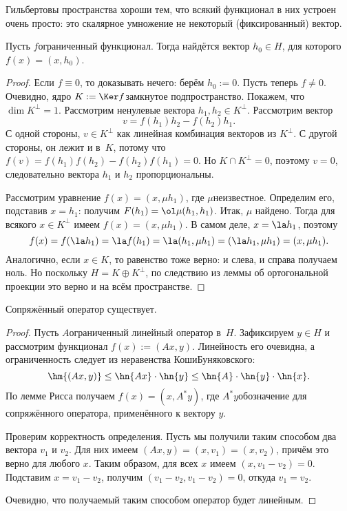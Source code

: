 \documentclass[a4paper]{article}
\begin{document}
Гильбертовы пространства хороши тем, что всякий функционал в них устроен очень просто: это скалярное умножение
не некоторый (фиксированный) вектор.

\begin{lemma}[Рисса]
Пусть $f$\т ограниченный функционал. Тогда найдётся вектор $h_0 \in H$, для которого $f(x) = (x,h_0)$.
\end{lemma}
\begin{proof}
Если $f \equiv 0$, то доказывать нечего: берём $h_0 := 0$. Пусть теперь $f \neq 0$.
Очевидно, ядро $K := \Ker f$\т замкнутое подпространство. Покажем, что $\dim K^\bot = 1$.
Рассмотрим ненулевые вектора $h_1, h_2 \in K^\bot$. Рассмотрим вектор
$$v = f(h_1)h_2 - f(h_2)h_1.$$
С одной стороны,
$v \in K^\bot$ как линейная комбинация векторов из $K^\bot$. С другой стороны, он лежит и в~$K$, потому что
$f(v) = f(h_1)f(h_2) - f(h_2)f(h_1) = 0$. Но $K \cap K^\bot = 0$, поэтому $v = 0$, следовательно
вектора $h_1$ и $h_2$ пропорциональны.

Рассмотрим уравнение $f(x) = (x, \mu h_1)$, где $\mu$\т неизвестное.
Определим его, подставив $x = h_1$: получим $F(h_1) = \ol \mu (h_1,h_1)$. Итак, $\mu$ найдено.
Тогда для всякого $x \in K^\bot$ имеем $f(x) = (x, \mu h_1)$. В самом деле, $x = \la h_1$, поэтому
$$f(x) = f(\la h_1) = \la f(h_1) = \la (h_1,\mu h_1) = (\la h_1,\mu h_1) = (x,\mu h_1).$$
Аналогично, если $x \in K$, то равенство тоже верно: и слева, и справа получаем ноль. Но поскольку $H = K\oplus K^\bot$,
по следствию из леммы об ортогональной проекции это верно и на всём пространстве.
\end{proof}

\begin{stm}
Сопряжённый оператор существует.
\end{stm}
\begin{proof}
Пусть $A$\т ограниченный линейный оператор в~$H$.
Зафиксируем $y \in H$ и рассмотрим функционал $f(x) := (Ax,y)$. Линейность его очевидна,
а ограниченность следует из неравенства Коши\ч Буняковского:
$$\hm{(Ax,y)} \le \hn{Ax}\cdot \hn{y} \le \hn{A}\cdot \hn{y} \cdot \hn{x}.$$
По лемме Рисса получаем $f(x) = (x,A^*y)$, где $A^*y$\т обозначение для сопряжённого оператора,
применённого к вектору $y$.

Проверим корректность определения. Пусть мы получили таким способом два
вектора $v_1$ и $v_2$. Для них имеем $(Ax,y) = (x,v_1) = (x,v_2)$,
причём это верно для любого $x$. Таким образом, для всех $x$ имеем $(x, v_1 - v_2) = 0$.
Подставим $x = v_1 - v_2$, получим $(v_1-v_2, v_1-v_2) = 0$, откуда $v_1 = v_2$.

Очевидно, что получаемый таким способом оператор будет линейным.
\end{proof}
\end{document}
